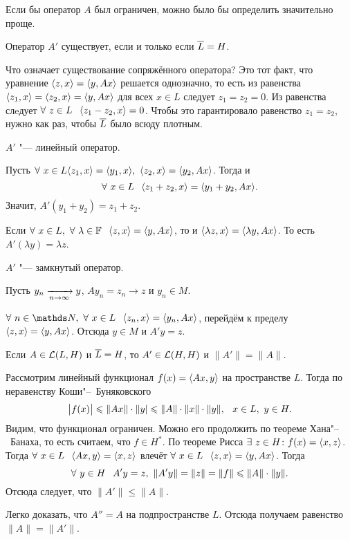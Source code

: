 Если бы оператор $A$ был ограничен, можно было бы определить значительно проще.
\begin{Ut}
  Оператор $A'$ существует, если и только если $\overline{L} = H$.
\end{Ut}
\begin{Proof}
  Что означает существование сопряжённого оператора? Это тот факт, что уравнение $\langle z,x\rangle = \langle y,Ax\rangle$ решается однозначно, то есть из равенства $\langle z_1,x\rangle = \langle z_2,x\rangle = \langle y,Ax\rangle$ для всех $x\in L$ следует $z_1=z_2=0$. Из равенства слeдует $\forall\ z\in L\pau \la z_1-z_2,x\ra=0$. Чтобы это гарантировало равенство $z_1=z_2$, нужно как раз, чтобы $\overline{L}$ было всюду плотным.
\end{Proof}
\begin{Ut}
$A'$ "--- линейный оператор.
\end{Ut}
\begin{Proof}
Пусть $\forall\ x\in L \langle z_1,x\rangle = \langle y_1,x\rangle,\ \langle z_2,x\rangle = \langle y_2,Ax\rangle$. Тогда и 
\[
  \forall\ x\in L\pau \la z_1+z_2,x\ra = \la y_1+y_2,Ax\ra.
\]
Значит, $A'(y_1+y_2) = z_1+z_2$.

Если $\forall\ x\in L,\ \forall\ \lambda\in \F\pau \la z,x\ra = \la y,Ax\ra$, то и 
$\langle \lambda z,x\rangle = \langle \lambda y,Ax\rangle$. То есть $A'(\lambda y) = \lambda z$.
\end{Proof}
\begin{Ut}
  $A'$ "--- замкнутый оператор.
\end{Ut}
\begin{Proof}
  Пусть $y_n\xrightarrow[n\rightarrow\infty]{} y$, $Ay_n = z_n\to z$ и $y_n\in M$.

$\forall\ n\in\N,\ \forall\ x\in L\pau \la z_n,x\ra = \la y_n,Ax\ra$, перейдём к пределу $\langle z,x\rangle =\langle y,Ax\rangle$. Отсюда $y\in M$ и $A'y=z$.
\end{Proof}
\begin{The}
  Если $A\in\mathcal L(L,H)$ и $\overline{L} = H$, то $A'\in \mathcal L(H,H)$ и $\|A'\|=\|A\|$.
\end{The}
\begin{Proof}
  Рассмотрим линейный функционал $f(x) = \langle Ax,y\rangle$ на пространстве $L$. Тогда по неравенству Коши"--~Буняковского
\[
  \big|f(x)\big|\leqslant \|Ax\|\cdot \|y|\leqslant \|A\|\cdot \|x\|\cdot \|y\|,\hskip .75em plus.1em minus.08em\relax x\in L,\ y\in H.
\]
Видим, что функционал ограничен. Можно его продолжить по теореме Хана"--~Банаха, то есть считаем, что $f\in H^*$. По теореме Рисса $\exists\ z\in H\colon f(x) = \langle x,z\rangle$.
 Тогда $\forall\ x\in L\pau \la Ax,y\ra=\la x,z\ra$ влечёт $\forall\ x\in L\pau \la z,x\ra = \la y,Ax\ra$. Тогда
\[
  \forall\ y\in H\hskip .75em plus.1em minus.08em\relax A'y = z,\ \|A'y\| = \|z\|=\|f\|\leqslant \|A\|\cdot \|y\|.
\]
Отсюда следует, что $\|A'\|\le \|A\|$.

Легко доказать, что $A''=A$ на подпространстве $L$. Отсюда получаем равенство $\|A\|=\|A'\|$.
\end{Proof}


